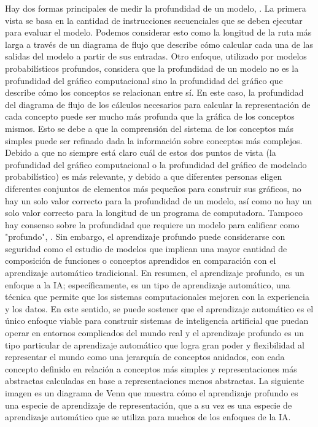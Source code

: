 	\vskip 0.4cm 
	Hay dos formas principales de medir la profundidad de un modelo, \citep{Goodfellow-et-al-2016}. La primera vista se basa en la cantidad de instrucciones secuenciales que se deben ejecutar para evaluar el modelo. Podemos considerar esto como la longitud de la ruta más larga a través de un diagrama de flujo que describe cómo calcular cada una de las salidas del modelo a partir de sus entradas. Otro enfoque, utilizado por modelos probabilísticos profundos, considera que la profundidad de un modelo no es la profundidad del gráfico computacional sino la profundidad del gráfico que describe cómo los conceptos se relacionan entre sí. En este caso, la profundidad del diagrama de flujo de los cálculos necesarios para calcular la representación de cada concepto puede ser mucho más profunda que la gráfica de los conceptos mismos. Esto se debe a que la comprensión del sistema de los conceptos más simples puede ser refinado dada la información sobre conceptos más complejos.
	\vskip 0.4cm 
	Debido a que no siempre está claro cuál de estos dos puntos de vista (la profundidad del gráfico computacional o la profundidad del gráfico de modelado probabilístico) es más relevante, y debido a que diferentes personas eligen diferentes conjuntos de elementos más pequeños para construir sus gráficos, no hay un solo valor correcto para la profundidad de un modelo, así como no hay un solo valor correcto para la longitud de un programa de computadora. Tampoco hay consenso sobre la profundidad que requiere un modelo para calificar como "profundo", \citep{Goodfellow-et-al-2016}. Sin embargo, el aprendizaje profundo puede considerarse con seguridad como el estudio de modelos que implican una mayor cantidad de composición de funciones o conceptos aprendidos en comparación con el aprendizaje automático tradicional.
	\vskip 0.4cm 
	En resumen, el aprendizaje profundo, es un enfoque a la IA; específicamente, es un tipo de aprendizaje automático, una técnica que permite que los sistemas computacionales mejoren con la experiencia y los datos. En este sentido, se puede sostener que el aprendizaje automático es el único enfoque viable para construir sistemas de inteligencia artificial que puedan operar en entornos complicados del mundo real y el aprendizaje profundo es un tipo particular de aprendizaje automático que logra gran poder y flexibilidad al representar el mundo como una jerarquía de conceptos anidados, con cada concepto definido en relación a conceptos más simples y representaciones más abstractas calculadas en base a representaciones menos abstractas. La siguiente imagen es un diagrama de Venn que muestra cómo el aprendizaje profundo es una especie de aprendizaje de representación, que a su vez es una especie de aprendizaje automático que se utiliza para muchos de los enfoques de la IA. 

